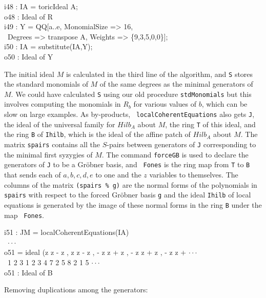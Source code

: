 \beginOutput
i48 : IA = toricIdeal A;\\
\emptyLine
o48 : Ideal of R\\
\endOutput
\beginOutput
i49 : Y = QQ[a..e, MonomialSize => 16,\\
\                  Degrees => transpose A, Weights => \{9,3,5,0,0\}];\\
\endOutput
\beginOutput
i50 : IA = substitute(IA,Y);\\
\emptyLine
o50 : Ideal of Y\\
\endOutput

The initial ideal $M$ is calculated in the third line of the
algorithm, and {\tt S} stores the standard monomials of $M$ of the
same degrees as the minimal generators of $M$. We could have
calculated {\tt S} using our old procedure {\tt stdMonomials} but this
involves computing the monomials in $R_b$ for various values of $b$,
which can be slow on large examples. As by-products, {\tt
  localCoherentEquations} also gets {\tt J}, the ideal of the
universal family for $Hilb_A$ about $M$, the ring {\tt T} of this
ideal, and the ring {\tt B} of {\tt Ihilb}, which is the ideal of the
affine patch of $Hilb_A$ about $M$. The matrix {\tt spairs} contains
all the $S$-pairs between generators of {\tt J} corresponding to the
minimal first syzygies of $M$. The command {\tt forceGB} is used to
declare the generators of {\tt J} to be a Gr\"obner basis, and {\tt
  Fones} is the ring map from {\tt T} to {\tt B} that sends each of
$a,b,c,d,e$ to one and the $z$ variables to themselves.  The columns
of the matrix {\tt (spairs \% g)} are the normal forms of the
polynomials in {\tt spairs} with respect to the forced Gr\"obner basis
{\tt g} and the ideal {\tt Ihilb} of local equations is generated by
the image of these normal forms in the ring {\tt B} under the map {\tt
  Fones}.

\beginOutput
i51 : JM = localCoherentEquations(IA)\\
\emptyLine
\                                                                       $\cdot\cdot\cdot$\\
o51 = ideal (z z  - z , z z  - z , - z z  + z , - z z  + z , - z z  +  $\cdot\cdot\cdot$\\
\              1 2    3   1 2    3     4 7    2     5 8    2     1 5    $\cdot\cdot\cdot$\\
\emptyLine
o51 : Ideal of B\\
\endOutput

Removing duplications among the generators:

